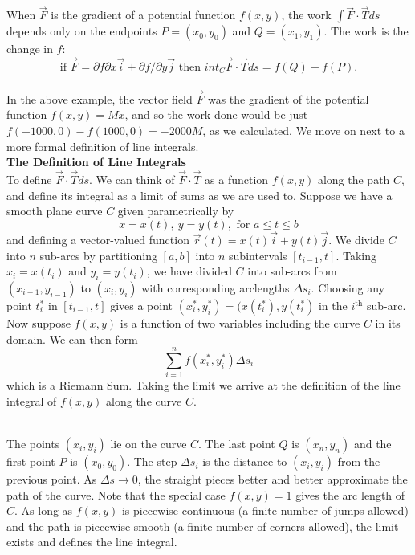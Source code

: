 {
When $\vec F$ is the gradient of a potential function $f(x, y)$, the work $\int \vec F \cdot \vec T ds$ depends only on the endpoints $P = (x_0,y_0)$ and $Q = (x_1,y_1)$. The work is the change in $f$:
$$\text{if } \vec F = \partial f \partial x \vec i + \partial f/\partial y \vec j \text{ then } int_C \vec F \cdot \vec T ds = f(Q) - f(P).$$
}\\

In the above example, the vector field $\vec F$ was the gradient of the potential function $f(x,y) = Mx$, and so the work done would be just $f(-1000,0) - f(1000,0) = -2000M$, as we calculated.  We move on next to a more formal definition of line integrals. \\




\noindent\textbf{\large The Definition of Line Integrals}\\

To define $\vec F \cdot \vec T ds$. We can think of $\vec F \cdot \vec T$ as a function $f(x, y)$
along the path $C$, and define its integral as a limit of sums as we are used to. Suppose we have a smooth plane curve $C$ given parametrically by
$$x = x(t), \: y = y(t), \text{ for } a \leq t \leq b$$
and defining a vector-valued function $\vec r (t) = x(t) \vec i + y(t) \vec j$.  We divide $C$ into $n$ sub-arcs by partitioning $[a,b]$ into $n$ subintervals $[t_{i-1},t]$. Taking $x_i = x(t_i)$ and $y_i = y(t_i)$, we have divided $C$ into sub-arcs from $(x_{i-1},y_{i-1})$ to $(x_i,y_i)$ with corresponding arclengths $\Delta s_i$.  Choosing any point $t_i^{\ast}$ in $[t_{i-1},t]$ gives a point $(x_i^{\ast},y_i^{\ast}) = (x(t_i^{\ast}), y(t_i^{\ast})$ in the $i^{\text{th}}$ sub-arc.\\

Now suppose $f(x,y)$ is a function of two variables including the curve $C$ in its domain.  We can then form
$$\sum_{i=1}^{n} f(x_i^{\ast},y_i^{\ast}) \Delta s_i$$
which is a Riemann Sum.  Taking the limit we arrive at the definition of the line integral of $f(x,y)$ along the curve $C$.


\\


The points $(x_i, y_i)$ lie on the curve $C$. The last point $Q$ is $(x_n, y_n)$ and the first point $P$ is $(x_0, y_0)$. The step $\Delta s_i$ is the distance to $(x_i, y_i)$ from the previous point. As $\Delta s \to 0$, the straight pieces better and better approximate the path of the curve. Note that the special case $f(x,y) = 1$ gives the arc length of $C$. As long as $f(x, y)$ is piecewise continuous (a finite number of jumps allowed) and the path is piecewise smooth (a finite number of corners allowed), the limit exists and defines the line integral.\\

